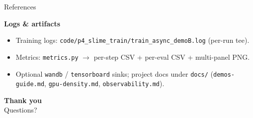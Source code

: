 \documentclass[aspectratio=169]{beamer}
\begin{document}
\begin{frame}[allowframebreaks]{References}
\begin{itemize}
  \end{itemize}
  \textbf{Logs \& artifacts}
  \begin{itemize}\setlength\itemsep{0.1em}
    \item Training logs: \texttt{code/p4\_slime\_train/train\_async\_demoB.log} (per-run tee).
    \item Metrics: \texttt{metrics.py} $\to$ per-step CSV + per-eval CSV + multi-panel PNG.
    \item Optional \texttt{wandb} / \texttt{tensorboard} sinks; project docs under \texttt{docs/}
      (\texttt{demos-guide.md}, \texttt{gpu-density.md}, \texttt{observability.md}).
  \end{itemize}
\end{frame}

\begin{frame}
  \begin{center}
    {\Huge \textbf{Thank you}}\\[1em]
    {\large Questions?}
  \end{center}
\end{frame}
\end{document}
